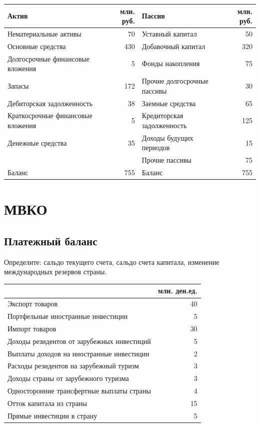 \documentclass[12pt, table, a4paper,twoside]{exam}
\begin{document}
\begin{questions}
\begin{solution}[12em]
\begin{tabularx}{\linewidth}[b]{@{}>{\raggedright\arraybackslash}XrXr@{}}	
	Актив & млн. руб. & Пассив & млн. руб. \\
	\midrule
	Нематериальные активы & 70    & Уставный капитал  & 50 \\
	Основные средства & 430   & Добавочный капитал  & 320 \\
	Долгосрочные финансовые вложения  & 5     & Фонды накопления  & 75 \\
	Запасы  & 172   & Прочие долгосрочные пассивы  & 30 \\
	Дебиторская задолженность  & 38    & Заемные средства  & 65 \\
	Краткосрочные финансовые вложения  & 5     & Кредиторская задолженность  & 125 \\
	Денежные средства  & 35    & Доходы будущих периодов  & 15 \\
	&       & Прочие пассивы  & 75 \\
	\midrule
	Баланс  & 755   & Баланс  & 755 \\
	\bottomrule
\end{tabularx}%
		
\end{solution}

\vfill\null\cleardoublepage
\section{МВКО}
\subsection{Платежный баланс}
\question[10] Определите: сальдо текущего счета, сальдо счета капитала, изменение международных резервов страны.

\begin{tabularx}{\linewidth}[b]{@{}>{\raggedright\arraybackslash}Xr@{}}	
	& млн. ден.ед. \\
	\midrule
	Экспорт товаров & 40 \\
	Портфельные иностранные инвестиции & 5 \\
	Импорт товаров & 30 \\
	Доходы резидентов от зарубежных инвестиций & 5 \\
	Выплаты доходов на иностранные инвестиции & 2 \\
	Расходы резидентов на зарубежный туризм & 3 \\
	Доходы страны от зарубежного туризма & 3 \\
	Односторонние трансфертные выплаты страны & 4 \\
	Отток капитала из страны & 15 \\
	Прямые инвестиции в страну & 5 \\
	\bottomrule
\end{tabularx}%



\end{questions}
\end{document}
